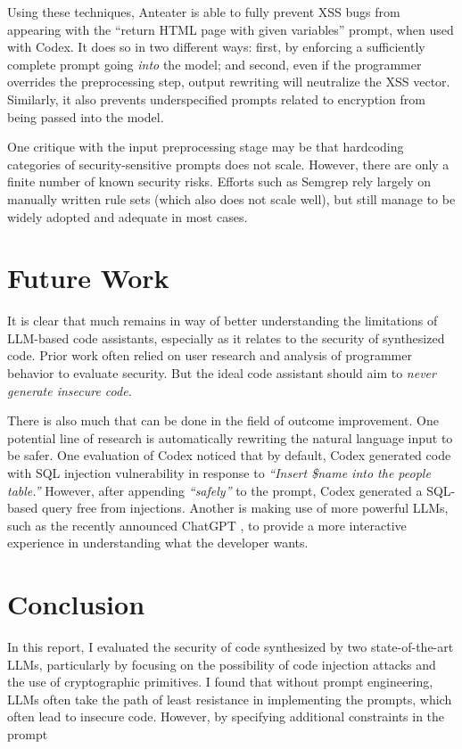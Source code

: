\documentclass[sigplan,screen,nonacm]{acmart}
\begin{document}
Using these techniques, Anteater is able to fully prevent XSS bugs from appearing with the ``return HTML page with given variables'' prompt, when used with Codex. It does so in two different ways: first, by enforcing a sufficiently complete prompt going \emph{into} the model; and second, even if the programmer overrides the preprocessing step, output rewriting will neutralize the XSS vector. Similarly, it also prevents underspecified prompts related to encryption from being passed into the model.

One critique with the input preprocessing stage may be that hardcoding categories of security-sensitive prompts does not scale. However, there are only a finite number of known security risks. Efforts such as Semgrep rely largely on manually written rule sets (which also does not scale well), but still manage to be widely adopted and adequate in most cases.

\section{Future Work} \label{sec:future}

It is clear that much remains in way of better understanding the limitations of LLM-based code assistants, especially as it relates to the security of synthesized code. Prior work often relied on user research \cite{nyuuserstudy,labstudypub} and analysis of programmer behavior to evaluate security. But the ideal code assistant should aim to \emph{never generate insecure code.}

There is also much that can be done in the field of outcome improvement. One potential line of research is automatically rewriting the natural language input to be safer. One evaluation of Codex \cite{smitop} noticed that by default, Codex generated code with SQL injection vulnerability in response to \emph{``Insert \$name into the people table.''} However, after appending \emph{``safely''} to the prompt, Codex generated a SQL-based query free from injections. Another is making use of more powerful LLMs, such as the recently announced ChatGPT \cite{chatgpt}, to provide a more interactive experience in understanding what the developer wants.

\section{Conclusion} \label{sec:conclusion}

In this report, I evaluated the security of code synthesized by two state-of-the-art LLMs, particularly by focusing on the possibility of code injection attacks and the use of cryptographic primitives. I found that without prompt engineering, LLMs often take the path of least resistance in implementing the prompts, which often lead to insecure code. However, by specifying additional constraints in the prompt
\end{document}
